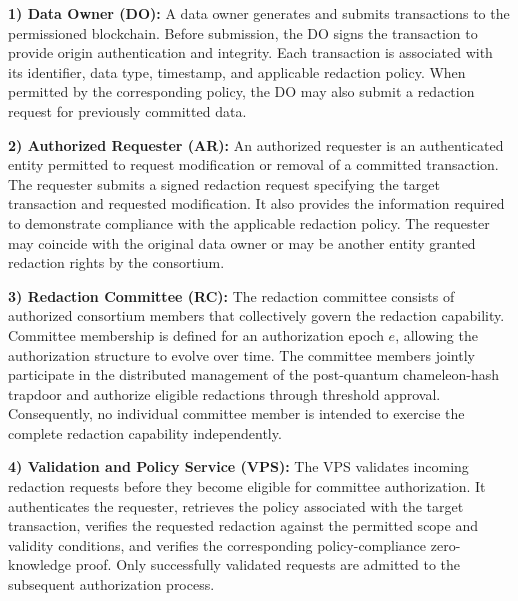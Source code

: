 \documentclass[lettersize,journal]{IEEEtran}
\begin{document}
\textbf{1) Data Owner (DO):}
A data owner generates and submits transactions to the permissioned
blockchain. Before submission, the DO signs the transaction to provide
origin authentication and integrity. Each transaction is associated
with its identifier, data type, timestamp, and applicable redaction
policy. When permitted by the corresponding policy, the DO may also
submit a redaction request for previously committed data.

\textbf{2) Authorized Requester (AR):}
An authorized requester is an authenticated entity permitted to request
modification or removal of a committed transaction. The requester
submits a signed redaction request specifying the target transaction
and requested modification. It also provides the information required
to demonstrate compliance with the applicable redaction policy. The
requester may coincide with the original data owner or may be another
entity granted redaction rights by the consortium.

\textbf{3) Redaction Committee (RC):}
The redaction committee consists of authorized consortium members that
collectively govern the redaction capability. Committee membership is
defined for an authorization epoch $e$, allowing the authorization
structure to evolve over time. The committee members jointly participate
in the distributed management of the post-quantum chameleon-hash
trapdoor and authorize eligible redactions through threshold approval.
Consequently, no individual committee member is intended to exercise
the complete redaction capability independently.

\textbf{4) Validation and Policy Service (VPS):}
The VPS validates incoming redaction requests before they become
eligible for committee authorization. It authenticates the requester,
retrieves the policy associated with the target transaction, verifies
the requested redaction against the permitted scope and validity
conditions, and verifies the corresponding policy-compliance
zero-knowledge proof. Only successfully validated requests are admitted
to the subsequent authorization process.
\end{document}
